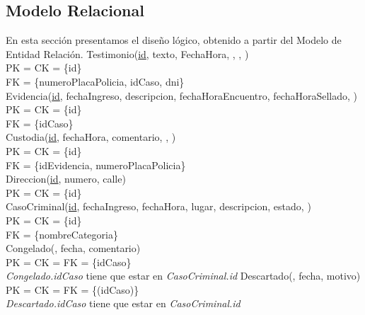 \documentclass[10pt,a4paper]{article}
\begin{document}
\subsection{Modelo Relacional}
En esta sección presentamos el diseño lógico, obtenido a partir del Modelo de Entidad Relación. 
\newline
\newline
Testimonio(\underline{id}, texto, FechaHora, , , )\\
	PK = CK = \{id\}\\ 
	FK = \{numeroPlacaPolicia, idCaso, dni\}\\ 
\newline
Evidencia(\underline{id}, fechaIngreso, descripcion, fechaHoraEncuentro, fechaHoraSellado, )\\ 
	PK = CK = \{id\} \\
	FK = \{idCaso\}\\ 
\newline
Custodia(\underline{id}, fechaHora, comentario, , )\\ 
	PK = CK = \{id\} \\
	FK = \{idEvidencia, numeroPlacaPolicia\}\\ 
\newline
Direccion(\underline{id}, numero, calle)\\ 
	PK = CK = \{id\}\\ 
\newline
CasoCriminal(\underline{id}, fechaIngreso, fechaHora, lugar, descripcion, estado, )\\ 
	PK = CK = \{id\}\\ 
	FK = \{nombreCategoria\}\\ 
\newline
Congelado(, fecha, comentario)\\ 
	PK = CK = FK = \{idCaso\}\\ 
\newline
\textit{Congelado.idCaso} tiene que estar en \textit{CasoCriminal.id}
\newline
\newline
Descartado(, fecha, motivo)\\ 
	PK = CK = FK = \{(idCaso)\}\\ 
\newline
\textit{Descartado.idCaso} tiene que estar en \textit{CasoCriminal.id}
\newline
\end{document}
